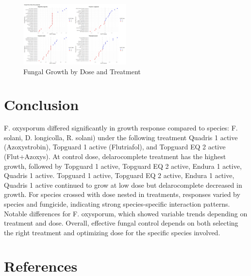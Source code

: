 \documentclass[
  10pt,
  letterpaper,
  twocolumn]{article}
\begin{document}
\begin{figure}

{\centering \includegraphics[width=0.5\textwidth,height=\textheight]{Fig21.jpeg}

}

\caption{Fungal Growth by Dose and Treatment}

\end{figure}

\hypertarget{conclusion}{%
\section{Conclusion}\label{conclusion}}

\vspace{-1em}

F. oxysporum differed significantly in growth response compared to
species: F. solani, D. longicolla, R. solani) under the following
treatment Quadris 1 active (Azoxystrobin), Topguard 1 active
(Flutriafol), and Topguard EQ 2 active (Flut+Azoxys). At control dose,
delarocomplete treatment has the highest growth, followed by Topguard 1
active, Topguard EQ 2 active, Endura 1 active, Quadris 1 active.
Topguard 1 active, Topguard EQ 2 active, Endura 1 active, Quadris 1
active continued to grow at low dose but delarocomplete decreased in
growth. For species crossed with dose nested in treatments, responses
varied by species and fungicide, indicating strong species-specific
interaction patterns. Notable differences for F. oxysporum, which showed
variable trends depending on treatment and dose. Overall, effective
fungal control depends on both selecting the right treatment and
optimizing dose for the specific species involved.

\hypertarget{references}{%
\section{References}\label{references}}
\end{document}
